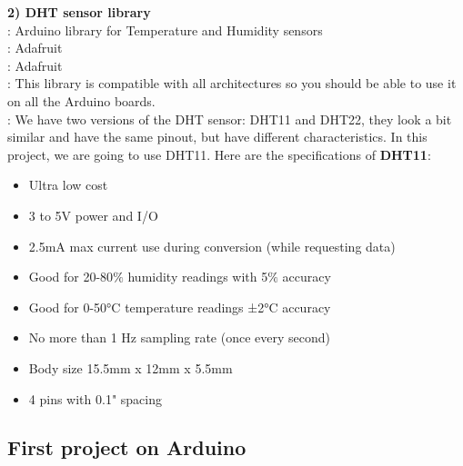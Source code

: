 \documentclass[a4paper]{article}
\begin{document}
\textbf{2) DHT sensor library}\\
\text{[Description]}: Arduino library for Temperature and Humidity sensors\\
\text{[Author]}: Adafruit\\
\text{[Maintainer]}: Adafruit\\
\text{[Compatibility]}: This library is compatible with all architectures so you should be able to use it on all the Arduino boards.\\
\text{[NOTE]}: We have two versions of the DHT sensor: DHT11 and DHT22, they look a bit similar and have the same pinout, but have different characteristics. In this project, we are going to use DHT11. Here are the specifications of \textbf{DHT11}:
\begin{itemize}
    \item Ultra low cost
    \item 3 to 5V power and I/O
    \item 2.5mA max current use during conversion (while requesting data)
    \item Good for 20-80$\%$ humidity readings with 5$\%$ accuracy
    \item Good for 0-50°C temperature readings ±2°C accuracy
    \item No more than 1 Hz sampling rate (once every second)
    \item Body size 15.5mm x 12mm x 5.5mm
    \item 4 pins with 0.1" spacing
\end{itemize}
\medskip

\subsection{First project on Arduino}
\end{document}
